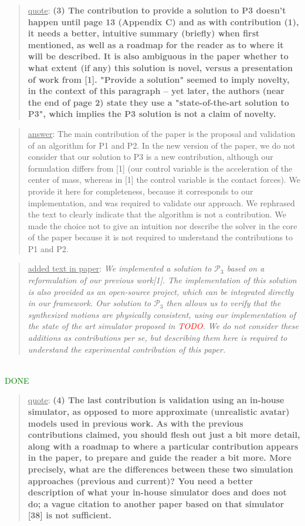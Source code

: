 \documentclass[a4paper]{article}
\newcommand{\done}[0]{\textcolor{green}{DONE}}
\newcommand\quot[1]{\begin{quote} \underline{quote}: \textbf{#1}\end{quote}}
\newcommand\as[1]{\begin{quote} \underline{answer}: {#1}\end{quote} }
\newcommand\qt[1]{\begin{quote} \underline{added text in paper}: \textit{#1}\end{quote} \leavevmode \\ }
\begin{document}
\quot{(3)	The contribution to provide a solution to P3 doesn't happen
until page 13 (Appendix C) and as with contribution (1), it needs a
better, intuitive summary (briefly) when first mentioned, as well as a
roadmap for the reader as to where it will be described. It is also
ambiguous in the paper whether to what extent (if any) this solution is
novel, versus a presentation of work from [1]. "Provide a solution"
seemed to imply novelty, in the context of this paragraph -- yet later,
the authors (near the end of page 2) state they use a "state-of-the-art
solution to P3", which implies the P3 solution is not a claim of
novelty.}

\as{The main contribution of the paper is the proposal and validation of an algorithm for P1 and P2. 
In the new version of the paper, we do not consider that our solution to P3
is a new contribution, although our formulation differs from [1] (our control variable is the acceleration
of the center of mass, whereas in [1] the control variable is the contact forces). We provide it here for completeness, because it corresponds to our implementation, and 
was required to validate our approach. 
We rephrased the text to clearly indicate that the algorithm is not a contribution. We made the choice not to give an intuition nor describe the solver in the core
of the paper because it is not required to understand the contributions to P1 and P2.}
\qt{ We implemented a solution to $\mathcal{P}_3$ based on a reformulation of our previous work[1]. The implementation of this solution is also provided as an open-source project, which can be integrated directly in our framework. Our solution to $\mathcal{P}_3$ then allows us to verify that the synthesized motions are physically consistent, using our implementation of the state of the art simulator proposed in \textcolor{red}{TODO}.
We do not consider these additions as contributions per se, but describing them here is required to understand the experimental contribution of this paper.}\done


\quot{
(4)	The last contribution is validation using an in-house
simulator, as opposed to more approximate (unrealistic avatar) models
used in previous work.	As with the previous contributions claimed, you
should flesh out just a bit more detail, along with a roadmap to where
a particular contribution appears in the paper, to prepare and guide
the reader a bit more. More precisely, what are the differences between
these two simulation approaches (previous and current)? You need a
better description of what your in-house simulator does and does not
do; a vague citation to another paper based on that simulator [38] is
not sufficient.}
\end{document}
